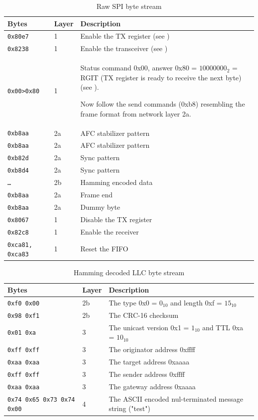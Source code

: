 \begin{table}[H]
\centering
\begin{tabular}{l | l | p{10cm}}
Bytes & Layer & Description \\
\hline
\texttt{0x80e7} & 1 & Enable the TX register (see \cite{sis4221_datasheet}) \\ 
\texttt{0x8238} & 1 & Enable the transceiver (see \cite{sis4221_datasheet}) \\ 
\texttt{0x00>0x80} & 1 & Status command 0x00, answer 0x80 = $10000000_{2}$ = RGIT (TX register is ready to receive the next byte) (see \cite{sis4221_datasheet}).

Now follow the send commands (0xb8) resembling the frame format from network layer 2a. \\ 
\texttt{0xb8aa} & 2a & AFC stabilizer pattern \\ 
\texttt{0xb8aa} & 2a & AFC stabilizer pattern \\ 
\texttt{0xb82d} & 2a & Sync pattern \\ 
\texttt{0xb8d4} & 2a & Sync pattern \\ 
\texttt{\dots} & 2b & Hamming encoded data\\ 
\texttt{0xb8aa} & 2a & Frame end \\ 
\texttt{0xb8aa} & 2a & Dummy byte \\ 
\texttt{0x8067} & 1 & Disable the TX register \\ 
\texttt{0x82c8} & 1 & Enable the receiver \\ 
\texttt{0xca81, 0xca83} & 1 & Reset the FIFO \\ 
\end{tabular}
\caption{Raw SPI byte stream}
\label{tab:research_lowerlayers}
\end{table}

\begin{table}[H]
\centering
\begin{tabular}{l | l | p{7cm}}
Bytes & Layer & Description \\
\hline
\texttt{0xf0 0x00} & 2b & The type 0x0 = $0_{10}$ and length 0xf = $15_{10}$ \\
\texttt{0x98 0xf1} & 2b & The CRC-16 checksum\\
\texttt{0x01 0xa} & 3 & The unicast version 0x1 = $1_{10}$ and TTL 0xa = $10_{10}$ \\
\texttt{0xff 0xff} & 3 & The originator address 0xffff \\
\texttt{0xaa 0xaa} & 3 & The target address 0xaaaa \\
\texttt{0xff 0xff} & 3 & The sender address 0xffff \\
\texttt{0xaa 0xaa} & 3 & The gateway address 0xaaaa \\
\texttt{0x74 0x65 0x73 0x74 0x00} & 4 & The ASCII encoded nul-terminated message string ("test") \\
\end{tabular}
\caption{Hamming decoded LLC byte stream}
\label{tab:research_llc}
\end{table}

